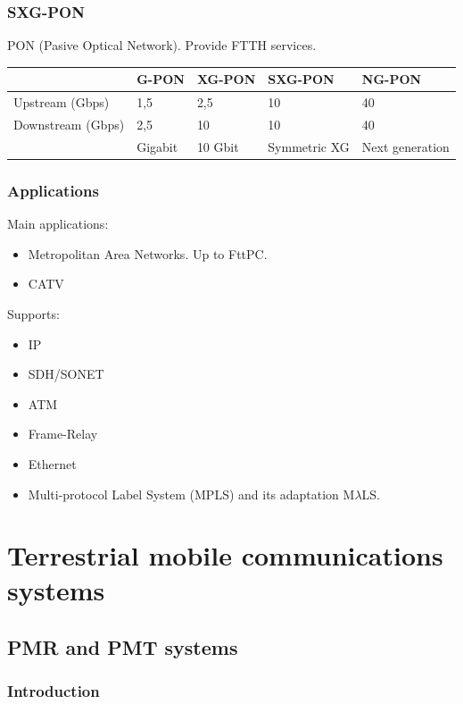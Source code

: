 \documentclass[
	12pt,
	twoside
]{book}
\begin{document}
\subsection{SXG-PON}

PON (Pasive Optical Network). Provide FTTH services.

\begin{tabular}{|l|l|l|l|l|}
	\hline
						& G-PON	& XG-PON	& SXG-PON	& NG-PON \\
	\hline
	Upstream (Gbps)		& 1,5	& 2,5		& 10		& 40 \\
	\hline
	Downstream (Gbps)	& 2,5	& 10		& 10		& 40 \\
	\hline
						& Gigabit			& 10 Gbit	& Symmetric XG	& Next generation \\
	\hline
\end{tabular}

\subsection{Applications}

Main applications:

\begin{itemize}
	\item Metropolitan Area Networks. Up to FttPC.
	\item CATV
\end{itemize}

Supports:

\begin{itemize}
	\item IP
	\item SDH/SONET
	\item ATM
	\item Frame-Relay
	\item Ethernet
	\item Multi-protocol Label System (MPLS) and its adaptation M$\lambda$LS.
\end{itemize}

\chapter{Terrestrial mobile communications systems}

\section{PMR and PMT systems}

\subsection{Introduction}
\end{document}
